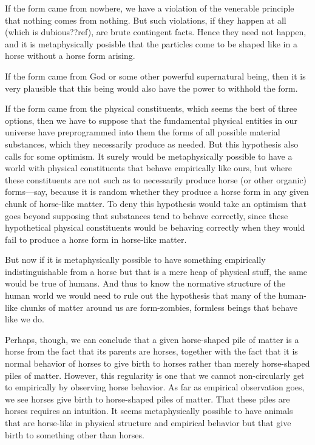 If the form came from nowhere, we have a violation of the venerable principle that nothing comes from nothing.
But such violations, if they happen at all (which is dubious??ref), are brute contingent facts. Hence they need
not happen, and it is metaphysically posisble that the particles come to be shaped like in a horse without a horse
form arising.

If the form came from God or some other powerful supernatural being, then it is very plausible that this being would also 
have the power to withhold the form.

If the form came from the physical constituents, which seems the best of three options, then we have to suppose that the 
fundamental physical entities in our universe have preprogrammed into them the forms of all possible material substances,
which they necessarily produce as needed. But this hypothesis also calls for some optimism. It surely would be metaphysically
possible to have a world with physical constituents that behave empirically like ours, but where these constituents are not 
such as to necessarily produce horse (or other organic) forms---say, because it is random whether they produce a horse form 
in any given chunk of horse-like matter. To deny this hypothesis would take an optimism that goes beyond supposing that 
substances tend to behave correctly, since these hypothetical physical constituents would be behaving correctly when they 
would fail to produce a horse form in horse-like matter.

But now if it is metaphysically possible to have something empirically indistinguishable from a horse but that is a mere
heap of physical stuff, the same would be true of humans. And thus to know the normative structure of the human world 
we would need to rule out the hypothesis that many of the human-like chunks of matter around us are form-zombies, formless
beings that behave like we do. 

Perhaps, though, we can conclude that a given horse-shaped pile of matter is a horse from the fact that its 
parents are horses, together with the fact that it is normal behavior of horses to give birth to horses rather
than merely horse-shaped piles of matter. However, this regularity is one that we cannot non-circularly get to 
empirically by observing horse behavior. As far as empirical observation goes, we see horses give birth to horse-shaped 
piles of matter. That these piles are horses requires an intuition. It seems metaphysically possible to have 
animals that are horse-like in physical structure and empirical behavior but that give birth to something other than horses.

